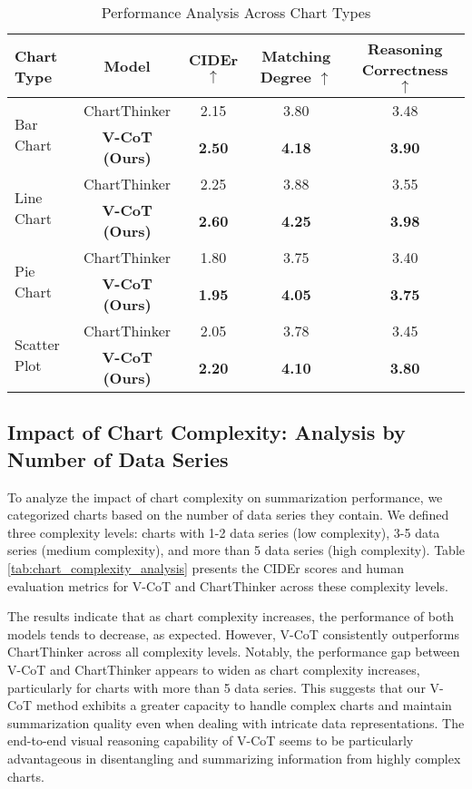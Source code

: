 \begin{table}[!t]\small
    \centering
    \caption{Performance Analysis Across Chart Types}
    \begin{tabular}{lcccc}
        \toprule
        Chart Type & Model & CIDEr $\uparrow$ & Matching Degree $\uparrow$ & Reasoning Correctness $\uparrow$ \\
        \midrule
        \multirow{2}{*}{Bar Chart} & ChartThinker & 2.15 & 3.80 & 3.48 \\
                                  & \textbf{V-CoT (Ours)} & \textbf{2.50} & \textbf{4.18} & \textbf{3.90} \\
        \midrule
        \multirow{2}{*}{Line Chart} & ChartThinker & 2.25 & 3.88 & 3.55 \\
                                   & \textbf{V-CoT (Ours)} & \textbf{2.60} & \textbf{4.25} & \textbf{3.98} \\
        \midrule
        \multirow{2}{*}{Pie Chart} & ChartThinker & 1.80 & 3.75 & 3.40 \\
                                  & \textbf{V-CoT (Ours)} & \textbf{1.95} & \textbf{4.05} & \textbf{3.75} \\
        \midrule
        \multirow{2}{*}{Scatter Plot} & ChartThinker & 2.05 & 3.78 & 3.45 \\
                                     & \textbf{V-CoT (Ours)} & \textbf{2.20} & \textbf{4.10} & \textbf{3.80} \\
        \bottomrule
    \end{tabular}
    \label{tab:chart_type_analysis}
\end{table}

\subsection{Impact of Chart Complexity: Analysis by Number of Data Series}

To analyze the impact of chart complexity on summarization performance, we categorized charts based on the number of data series they contain. We defined three complexity levels: charts with 1-2 data series (low complexity), 3-5 data series (medium complexity), and more than 5 data series (high complexity). Table \ref{tab:chart_complexity_analysis} presents the CIDEr scores and human evaluation metrics for V-CoT and ChartThinker across these complexity levels.

The results indicate that as chart complexity increases, the performance of both models tends to decrease, as expected. However, V-CoT consistently outperforms ChartThinker across all complexity levels. Notably, the performance gap between V-CoT and ChartThinker appears to widen as chart complexity increases, particularly for charts with more than 5 data series. This suggests that our V-CoT method exhibits a greater capacity to handle complex charts and maintain summarization quality even when dealing with intricate data representations.  The end-to-end visual reasoning capability of V-CoT seems to be particularly advantageous in disentangling and summarizing information from highly complex charts.

